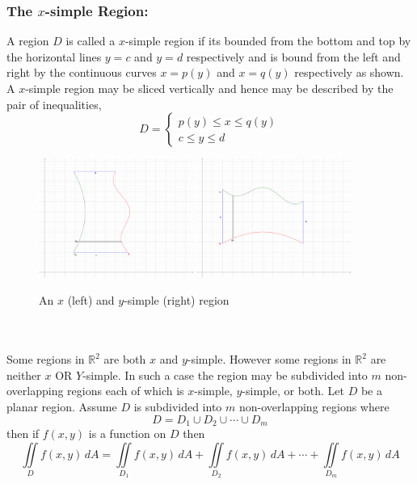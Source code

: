 \documentclass[14pt]{article}
\begin{document}
    \subsubsection{The $x$-simple Region:}
    A region $D$ is called a $x$-simple region if its bounded from the
    bottom and top by the horizontal lines $y=c$ and $y=d$ respectively
    and is bound from the left and right by the continuous curves
    $x=p(y)$ and $x=q(y)$ respectively as shown. A $x$-simple region may
    be sliced vertically and hence may be described by the pair of
    inequalities,
    $$D=\left\{\begin{array}{lr} p(y)\leq x\leq q(y)\\
        c\leq y \leq d \end{array}\right.$$
    \begin{figure}[th!]
        \includegraphics[width=0.45\textwidth]{x-simple.eps}
        \hspace{0.09\textwidth}
        \includegraphics[width=0.45\textwidth]{y-simple.eps}
        \caption{An $x$ (left) and $y$-simple (right) region}
    \end{figure}\\\\
    Some regions in $\mathbb{R}^2$ are both $x$ and $y$-simple. However
    some regions in $\mathbb{R}^2$ are neither $x$ OR $Y$-simple. In
    such a case the region may be subdivided into $m$ non-overlapping
    regions each of which is $x$-simple, $y$-simple, or both. Let $D$ be
    a planar region. Assume $D$ is subdivided into $m$ non-overlapping
    regions where
    $$D=D_1\cup D_2\cup\cdots\cup D_m$$ then if $f(x,y)$ is a function
    on $D$ then 
    $$\iint\limits_Df(x,y)\, dA=\iint\limits_{D_1}f(x,y)\,
    dA+\iint\limits_{D_2}f(x,y)\, dA+\cdots+\iint\limits_{D_m}f(x,y)\,
    dA$$  
\end{document}
